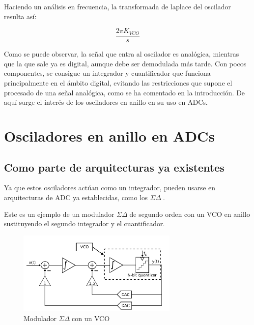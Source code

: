 \documentclass[12pt]{report} %
\newcommand{\sigmadelta}{$\Sigma\Delta\; $}
\begin{document}
	Haciendo un análisis en frecuencia, la transformada de laplace del oscilador resulta así:
	
	\begin{figure}[H]
		\begin{equation}
			\label{vco-laplace}
			\frac{2 \pi K_{VCO}}{s}
		\end{equation}
		\footnotemark
	\end{figure}
	
	
	Como se puede observar, la señal que entra al oscilador es analógica, mientras que la que sale ya es digital, aunque debe ser demodulada más tarde. Con pocos componentes, se consigue un integrador y cuantificador que funciona principalmente en el ámbito digital, evitando las restricciones que supone el procesado de una señal analógica, como se ha comentado en la introducción. De aquí surge el interés de los osciladores en anillo en su uso en ADCs.
	
	\section{Osciladores en anillo en ADCs}
	
	\subsection{Como parte de arquitecturas ya existentes}
	Ya que estos osciladores actúan como un integrador, pueden usarse en arquitecturas de ADC ya establecidas, como los \sigmadelta.
	
	Este es un ejemplo de un modulador \sigmadelta de segundo orden con un VCO en anillo sustituyendo el segundo integrador y el cuantificador.
	\begin{figure}[H]
		\includegraphics[width=0.7\textwidth]{sd-with-vco.png}
		\caption[Modulador \sigmadelta con un VCO]{Modulador \sigmadelta con un VCO\protect\footnotemark}
		\label{fig:sd-with-vco.png}
	\end{figure}
	
\end{document}

